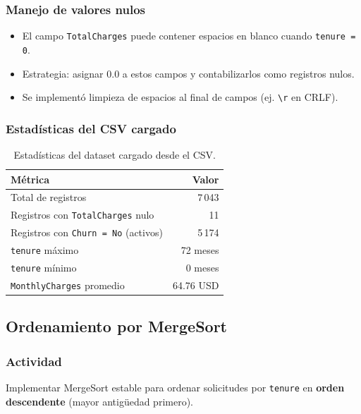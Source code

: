 \documentclass[12pt, a4paper]{article}
\begin{document}
\subsubsection*{Manejo de valores nulos}

\begin{itemize}
  \item El campo \texttt{TotalCharges} puede contener espacios en blanco cuando \texttt{tenure = 0}.
  \item Estrategia: asignar $0.0$ a estos campos y contabilizarlos como registros nulos.
  \item Se implementó limpieza de espacios al final de campos (ej. \texttt{\textbackslash r} en CRLF).
\end{itemize}

\subsubsection*{Estadísticas del CSV cargado}

\begin{table}[h!]
\centering
\small
\begin{tabularx}{\textwidth}{lr}
\toprule
\textbf{Métrica} & \textbf{Valor} \\
\midrule
Total de registros & 7\,043 \\
Registros con \texttt{TotalCharges} nulo & 11 \\
Registros con \texttt{Churn = No} (activos) & 5\,174 \\
\texttt{tenure} máximo & 72 meses \\
\texttt{tenure} mínimo & 0 meses \\
\texttt{MonthlyCharges} promedio & 64.76 USD \\
\bottomrule
\end{tabularx}
\caption{Estadísticas del dataset cargado desde el CSV.}
\end{table}

\subsection{Ordenamiento por MergeSort}

\subsubsection*{Actividad}

Implementar MergeSort estable para ordenar solicitudes por \texttt{tenure} en \textbf{orden descendente} (mayor antigüedad primero).
\end{document}
